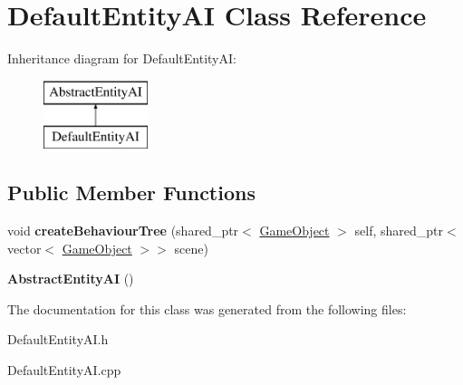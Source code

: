 \hypertarget{class_default_entity_a_i}{}\section{Default\+Entity\+AI Class Reference}
\label{class_default_entity_a_i}
Inheritance diagram for Default\+Entity\+AI\+:\begin{figure}[H]
\begin{center}
\leavevmode
\includegraphics[height=2.000000cm]{class_default_entity_a_i}
\end{center}
\end{figure}
\subsection*{Public Member Functions}
\begin{DoxyCompactItemize}
\item 
\mbox{\label{class_default_entity_a_i_a86fb7d0e18f1e3de4dd1fb3aea5acf84}} 
void {\bfseries create\+Behaviour\+Tree} (shared\+\_\+ptr$<$ \mbox{\hyperlink{class_game_object}{Game\+Object}} $>$ self, shared\+\_\+ptr$<$ vector$<$ \mbox{\hyperlink{class_game_object}{Game\+Object}} $>$$>$ scene)
\item 
\mbox{\label{class_default_entity_a_i_a4234e9abd92d2e26a69d318fc3491dc1}} 
{\bfseries Abstract\+Entity\+AI} ()
\end{DoxyCompactItemize}


The documentation for this class was generated from the following files\+:\begin{DoxyCompactItemize}
\item 
Default\+Entity\+A\+I.\+h\item 
Default\+Entity\+A\+I.\+cpp\end{DoxyCompactItemize}
